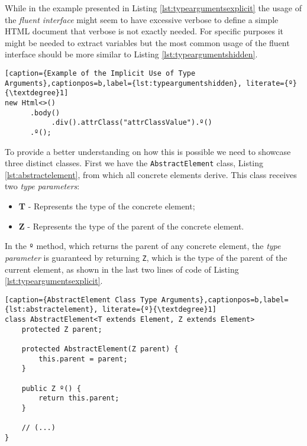 \noindent
While in the example presented in Listing \ref{lst:typeargumentsexplicit} the usage of the \textit{fluent interface} might seem to have excessive verbose to define a simple \ac{HTML} document that verbose is not exactly needed. For specific purposes it might be needed to extract variables but the most common usage of the fluent interface should be more similar to Listing \ref{lst:typeargumentshidden}.  

\bigskip


\begin{minipage}{\linewidth}
\begin{lstlisting}[caption={Example of the Implicit Use of Type Arguments},captionpos=b,label={lst:typeargumentshidden}, literate={º}{\textdegree}1]
new Html<>()
      .body()
           .div().attrClass("attrClassValue").º()
      .º();
\end{lstlisting}
\end{minipage}

\noindent
To provide a better understanding on how this is possible we need to showcase three distinct classes. First we have the \texttt{AbstractElement} class, Listing \ref{lst:abstractelement}, from which all concrete elements derive. This class receives two \textit{type parameters}: 

\begin{itemize}
	\item \textbf{T} - Represents the type of the concrete element; 
	\item \textbf{Z} - Represents the type of the parent of the concrete element.
\end{itemize}	


\noindent
In the \texttt{º} method, which returns the parent of any concrete element, the \textit{type parameter} is guaranteed by returning \texttt{Z}, which is the type of the parent of the current element, as shown in the last two lines of code of Listing \ref{lst:typeargumentsexplicit}.

\bigskip

\begin{minipage}{\linewidth}
\begin{lstlisting}[caption={AbstractElement Class Type Arguments},captionpos=b,label={lst:abstractelement}, literate={º}{\textdegree}1]
class AbstractElement<T extends Element, Z extends Element>
	protected Z parent;
	
    protected AbstractElement(Z parent) {
        this.parent = parent;
    }	
	
	public Z º() {
		return this.parent;
	}
	
	// (...)
}
\end{lstlisting}
\end{minipage}


